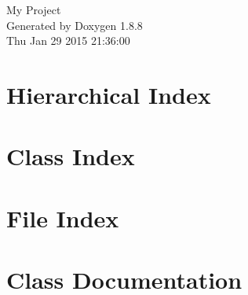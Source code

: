 \documentclass[twoside]{book}
\newcommand{\+}{\discretionary{\mbox{\scriptsize$\hookleftarrow$}}{}{}}
\newcommand{\clearemptydoublepage}{%
  \newpage{\pagestyle{empty}\cleardoublepage}%
}
\begin{document}
\hypersetup{pageanchor=false,
             bookmarks=true,
             bookmarksnumbered=true,
             pdfencoding=unicode
            }
\begin{titlepage}
\vspace*{7cm}
\begin{center}%
{\Large My Project }\\
\vspace*{1cm}
{\large Generated by Doxygen 1.8.8}\\
\vspace*{0.5cm}
{\small Thu Jan 29 2015 21:36:00}\\
\end{center}
\end{titlepage}
\clearemptydoublepage
\tableofcontents
\clearemptydoublepage
{}
\hypersetup{pageanchor=true}

\chapter{Hierarchical Index}

\chapter{Class Index}

\chapter{File Index}

\chapter{Class Documentation}



































\end{document}
